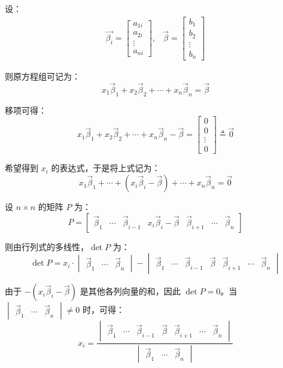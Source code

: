 设：
$$
\begin{matrix}
	\vec{\beta_i} = \begin{bmatrix} a_{1i} \\ a_{2i} \\ \vdots \\ a_{ni} \end{bmatrix},
	&
	\vec{\beta} = \begin{bmatrix} b_1 \\ b_2 \\ \vdots \\ b_n \end{bmatrix}
\end{matrix}
$$

则原方程组可记为：
$$
x_1 \vec \beta_1 + x_2 \vec \beta_2 + \cdots + x_n \vec \beta_n = \vec \beta
$$

移项可得：
$$
x_1 \vec \beta_1 + x_2 \vec \beta_2 + \cdots + x_n \vec \beta_n - \vec \beta =
\begin{bmatrix} 0 \\ 0 \\ \vdots \\ 0 \end{bmatrix}
\triangleq \vec 0
$$

希望得到 $x_i$ 的表达式，于是将上式记为：
$$
x_1 \vec \beta_1 + \cdots + (x_i \vec \beta_i - \vec \beta) + \cdots + x_n \vec \beta_n = \vec 0
$$

设 $n \times n$ 的矩阵 $P$ 为：
$$
P =
\begin{bmatrix} \vec \beta_1 & \cdots & \vec \beta_{i - 1} & x_i \vec \beta_i - \vec \beta & \vec \beta_{i + 1} & \cdots & \vec \beta_n \end{bmatrix}
$$

则由行列式的多线性，$\det P$ 为：
$$
\det P = x_i \cdot
\begin{vmatrix} \vec \beta_1 & \cdots & \vec \beta_n \end{vmatrix}
-
\begin{vmatrix} \vec \beta_1 & \cdots & \vec \beta_{i - 1} & \vec \beta & \vec \beta_{i + 1} & \cdots & \vec \beta_n \end{vmatrix}
$$

由于 $-(x_i \vec \beta_i - \vec \beta)$ 是其他各列向量的和，因此 $\det P = 0$。当 $\begin{vmatrix} \vec \beta_1 & \cdots & \vec \beta_n \end{vmatrix} \ne 0$ 时，可得：
$$
x_i = \dfrac{\begin{vmatrix} \vec \beta_1 & \cdots & \vec \beta_{i - 1} &\vec \beta & \vec \beta_{i + 1} & \cdots & \vec \beta_n \end{vmatrix}}{\begin{vmatrix} \vec \beta_1 & \cdots & \vec \beta_n \end{vmatrix}}
$$

